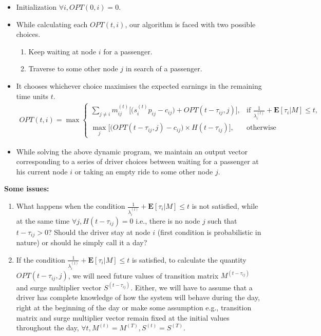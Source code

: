\begin{itemize}
\item Initialization
    $\forall i, OPT(0,i) = 0$.
    
\item While calculating each $OPT(t,i)$, our algorithm is faced with two possible choices.
    \begin{enumerate}
    \item Keep waiting at node $i$ for a passenger.
    \item Traverse to some other node $j$ in search of a passenger.
    \end{enumerate}
\item It chooses whichever choice maximises the expected earnings in the remaining time units $t$. 
\begin{eqnarray*}
OPT(t,i) = \max
    \begin{cases}
    \sum\limits_{j\neq i}m_{ij}^{(t)}\bigg[\Big(s_{i}^{(t)} p_{ij} - c_{ij}\Big) + OPT(t-\tau_{ij},j)\bigg], & \text{if } \frac{1}{\lambda_i^{(t)}} + \mathbf{E}[\tau_i|M] \leq t,\\
    \max\limits_{j}\Big[\Big(OPT(t-\tau_{ij},j) - c_{ij}\Big)\times H(t - \tau_{ij})\Big], & \text{otherwise}
    \end{cases}
\end{eqnarray*}

\item While solving the above dynamic program, we maintain an output vector corresponding to a series of driver choices between waiting for a passenger at his current node $i$ or taking an empty ride to some other node $j$.
\end{itemize}

\textbf{Some issues:}
\begin{enumerate}
\item What happens when the condition $\frac{1}{\lambda_i^{(t)}} + \mathbf{E}[\tau_i|M] \leq t$ is not satisfied, while at the same time $\forall j, H(t-\tau_{ij})=0$ i.e., there is no node $j$ such that $t-\tau_{ij}>0$? Should the driver stay at node $i$ (first condition is probabilistic in nature) or should he simply call it a day? \\
\item If the condition $\frac{1}{\lambda_i^{(t)}} + \mathbf{E}[\tau_i|M] \leq t$ is satisfied, to calculate the quantity $OPT(t-\tau_{ij},j)$, we will need future values of transition matrix $M^{(t -\tau_{ij})}$ and surge multiplier vector $S^{(t - \tau_{ij})}$. Either, we will have to assume that a driver has complete knowledge of how the system will behave during the day, right at the beginning of the day or make some assumption e.g., transition matrix and surge multiplier vector remain fixed at the initial values throughout the day, $\forall t, M^{(t)} = M^{(T)}, S^{(t)} = S^{(T)}$. \\
\end{enumerate}
